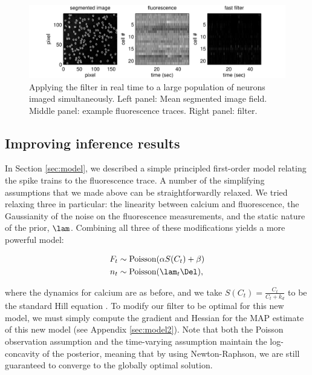 \begin{figure}[h!]
\centering \includegraphics[width=.9\linewidth]{../figs/pop}
\caption{Applying the \foopsi filter in real time to a large population of neurons imaged simultaneously.  Left panel: Mean segmented image field.  Middle panel: example fluorescence traces.  Right panel: \foopsi filter.} \label{fig:pop}
\end{figure}


\subsection{Improving inference results}

In Section \ref{sec:model}, we described a simple principled first-order model relating the spike trains to the fluorescence trace.  A number of the simplifying assumptions that we made above can be straightforwardly relaxed.  We tried relaxing three in particular: the linearity between calcium and fluorescence, the Gaussianity of the noise on the fluorescence measurements, and the static nature of the prior, $\lam$.  Combining all three of these modifications yields a more powerful model:


\begin{align}
	F_t &\sim \text{Poisson}(\alpha S(C_t) + \beta) \label{eq:nonlin} \\
	n_t &\sim \text{Poisson}(\lam_t \Del),
\end{align}

\noindent where the dynamics for calcium are as before, and we take $S(C_t)=\frac{C_t}{C_t + k_d}$ to be the standard Hill equation \cite{PologrutoSvoboda04}.  To modify our \foopsi filter to be optimal for this new model, we must simply compute the gradient and Hessian for the MAP estimate of this new model (see Appendix \ref{sec:model2}).  Note that both the Poisson observation assumption and the time-varying assumption maintain the log-concavity of the posterior, meaning that by using Newton-Raphson, we are still guaranteed to converge to the globally optimal solution.   

